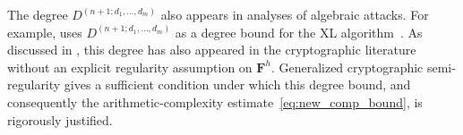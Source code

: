 \documentclass{article}
\theoremstyle{definition}
\theoremstyle{plain}
\theoremstyle{plain}
\theoremstyle{plain}
\theoremstyle{plain}
\numberwithin{equation}{subsection}
\begin{document}
The degree $D^{(n+1;d_1,\ldots,d_m)}$ also appears in analyses of algebraic attacks.
For example, \cite[Section~2.3]{FK24} uses $D^{(n+1;d_1,\ldots,d_m)}$ as a degree bound for the XL algorithm~\cite{XL}.
As discussed in \cite[Section~2.3, in particular Remark~1]{FK24}, this degree has also appeared in the cryptographic literature without an explicit regularity assumption on $\bm F^h$.
Generalized cryptographic semi-regularity gives a sufficient condition under which this degree bound, and consequently the arithmetic-complexity estimate~\eqref{eq:new_comp_bound}, is rigorously justified.
\end{document}
